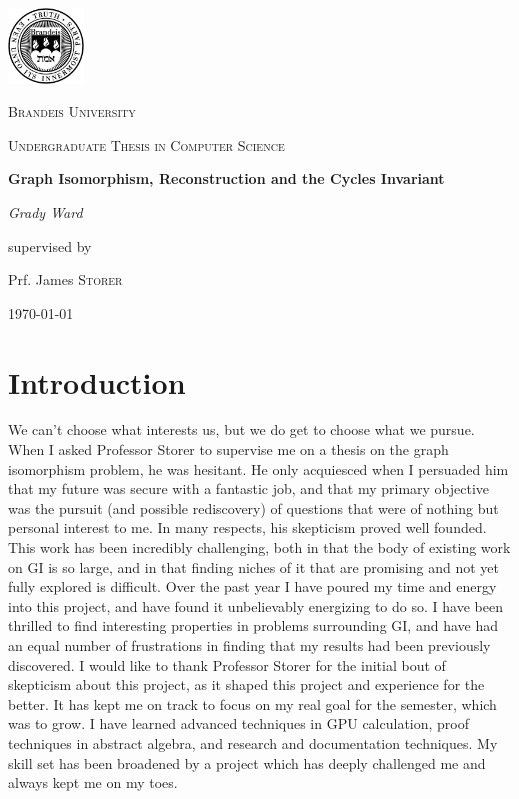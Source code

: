 \documentclass[11pt,a4paper]{report}
\begin{document}
\begin{titlepage}
	\centering
	\includegraphics[width=0.15\textwidth]{brandeis-seal}\par\vspace{1cm}
	{\scshape\LARGE Brandeis University \par}
	\vspace{1cm}
	{\scshape\Large Undergraduate Thesis in Computer Science\par}
	\vspace{1.5cm}
	{\huge\bfseries Graph Isomorphism, Reconstruction and the Cycles Invariant\par}
	\vspace{2cm}
	{\Large\itshape Grady Ward\par}
	\vfill
	supervised by\par
	Prf. James \textsc{Storer}
	\vfill

	{\large \today\par}
\end{titlepage}

\tableofcontents

\chapter*{Introduction}
We can't choose what interests us, but we do get to choose what we pursue.
When I asked Professor Storer to supervise me on a thesis on the graph isomorphism problem, he was hesitant.
He only acquiesced when I persuaded him that my future was secure with a fantastic job, and that my primary objective was the pursuit (and possible rediscovery) of questions that were of nothing but personal interest to me.
In many respects, his skepticism proved well founded.
This work has been incredibly challenging, both in that the body of existing work on GI is so large, and in that finding niches of it that are promising and not yet fully explored is difficult.
Over the past year I have poured my time and energy into this project, and have found it unbelievably energizing to do so.
I have been thrilled to find interesting properties in problems surrounding GI, and have had an equal number of frustrations in finding that my results had been previously discovered.
I would like to thank Professor Storer for the initial bout of skepticism about this project, as it shaped this project and experience for the better.
It has kept me on track to focus on my real goal for the semester, which was to grow.
I have learned advanced techniques in GPU calculation, proof techniques in abstract algebra, and research and documentation techniques.
My skill set has been broadened by a project which has deeply challenged me and always kept me on my toes.
\end{document}
